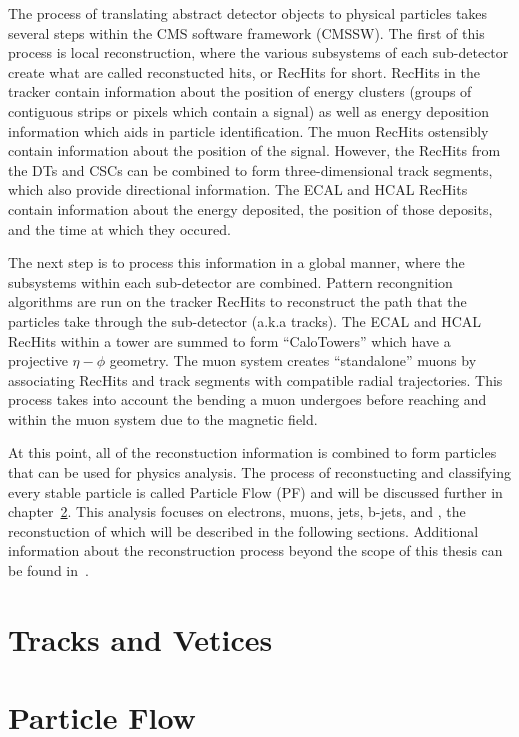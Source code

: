 The process of translating abstract detector objects to physical particles takes several steps within the CMS software framework (CMSSW).
The first of this process is local reconstruction, where the various subsystems of each sub-detector create what are called reconstucted hits, or RecHits for short.
RecHits in the tracker contain information about the position of energy clusters (groups of contiguous strips or pixels which contain a signal) as well as energy deposition information which aids in particle identification.
The muon RecHits ostensibly contain information about the position of the signal.
However, the RecHits from the DTs and CSCs can be combined to form three-dimensional track segments, which also provide directional information.
The ECAL and HCAL RecHits contain information about the energy deposited, the position of those deposits, and the time at which they occured.

The next step is to process this information in a global manner, where the subsystems within each sub-detector are combined.
Pattern recongnition algorithms are run on the tracker RecHits to reconstruct the path that the particles take through the sub-detector (a.k.a tracks).
The ECAL and HCAL RecHits within a tower are summed to form ``CaloTowers'' which have a projective $\eta-\phi$ geometry.
The muon system creates ``standalone'' muons by associating RecHits and track segments with compatible radial trajectories.
This process takes into account the bending a muon undergoes before reaching and within the muon system due to the magnetic field.

At this point, all of the reconstuction information is combined to form particles that can be used for physics analysis.
The process of reconstucting and classifying every stable particle is called Particle Flow (PF) and will be discussed further in chapter~\ref{sec:particle_flow}.
This analysis focuses on electrons, muons, jets, b-jets, and \ETslash, the reconstuction of which will be described in the following sections.
Additional information about the reconstruction process beyond the scope of this thesis can be found in~\cite{TDR-software}.

\section{Tracks and Vetices}
\label{sec:tracks_and_vertices}



\section{Particle Flow}
\label{sec:particle_flow}

























